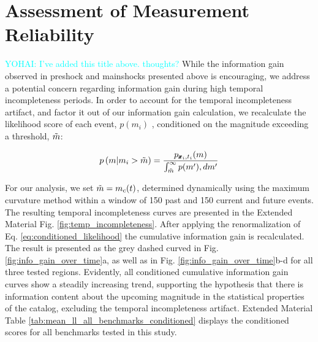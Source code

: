 \documentclass[pdflatex]{sn-jnl}
\newcommand{\neri}[1]{{\textcolor{cyan}{#1}}}
\begin{document}
\section{Assessment of Measurement Reliability}
\neri{YOHAI: I've added this title above. thoughts?}\newline
While the information gain observed in preshock and mainshocks presented above is encouraging, we address a potential concern regarding information gain during high temporal incompleteness periods\cite{stockman_forecasting_2023}. In order to account for the temporal incompleteness artifact, and factor it out of our information gain calculation, we recalculate the likelihood score of each event, $p(m_i)$ , conditioned on the magnitude exceeding a threshold, $\Tilde{m}$:

\begin{equation}
    p \left( m \vert m_i > \Tilde{m} \right) = \frac{p_{\pmb{x}_i, t_i}(m)} {\int_{\Tilde{m}}^{\infty} p(m') ,dm'}
    \label{eq:conditioned_likelihood}
\end{equation}

For our analysis, we set $\Tilde{m} = m_c(t)$, determined dynamically using the maximum curvature method \cite{wiemer_minimum_2000} within a window of 150 past and 150 current and future events. The resulting temporal incompleteness curves are presented in the Extended Material Fig. \ref{fig:temp_incompleteness}. After applying the renormalization of Eq. \ref{eq:conditioned_likelihood} the cumulative information gain is recalculated. The result is presented as the grey dashed curved in Fig.  \ref{fig:info_gain_over_time}a, as well as in Fig. \ref{fig:info_gain_over_time}b-d for all three tested regions. Evidently, all conditioned cumulative information gain curves show a steadily increasing trend, supporting the hypothesis that there is information content about the upcoming magnitude in the statistical properties of the catalog, excluding the temporal incompleteness artifact. Extended Material Table \ref{tab:mean_ll_all_benchmarks_conditioned} displays the conditioned scores for all benchmarks tested in this study.
\end{document}
